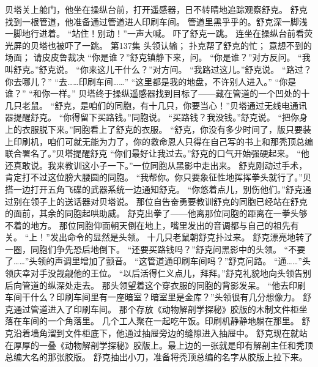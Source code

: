 \documentclass[a4paper,12pt,UTF8,twoside]{ctexbook}
\begin{document}
        贝塔关上舱门，他坐在操纵台前，打开遥感器，日不转睛地追踪观察舒克。 
        舒克找到一根管道，他准备通过管道进人印刷车间。 
        管道里黑乎乎的。舒克深一脚浅一脚地行进着。 
        “站住！别动！”一声大喊。 
        吓了舒克一跳。 
        连坐在操纵台前看荧光屏的贝塔也被吓了一跳。   第137集 
        头领认输； 
        扑克帮了舒克的忙； 
        意想不到的场面； 
        请皮皮鲁裁决   
        “你是谁？”舒克镇静下来，问。 
        “你是谁？”对方反问。 
        “我叫舒克。”舒克说。 
        “你来这儿干什么？”对方间。 
        “我路过这儿。”舒克说。 
        “路过？你去哪儿？” 
        “去……印刷车间……” 
        “这里都是我的地盘，不许别人进入。” 
        “你是谁？” 
        “和你一样。” 
        贝塔终于操纵遥感器找到目标了——藏在管道的一个凹处的十几只老鼠。 
        “舒克，是咱们的同胞，有十几只，你要当心！”贝塔通过无线电通讯器提醒舒克。 
        “你得留下买路钱。”同胞说。 
        “买路钱？我没钱。”舒克说。 
        “把你身上的衣服脱下来。”同胞看上了舒克的衣服。 
        “舒克，你没有多少时间了，版只要装上印刷机，咱们可就无能为力了，你的救命恩人只得在自己写的书上和那秃顶总编联合署名了。”贝塔提醒舒克 
        “你们最好让我过去。”舒克的口气开始强硬起来。 
        “他还真敢说。我来教训这小子一下。”一位同胞从黑影中走出来。 
        舒克刚动过手术，肯定打不过这位膀大腰圆的同胞。 
        “我帮你。你只要象征性地挥挥拳头就行了。”贝搭一边打开五角飞碟的武器系统一边通知舒克。 
        “你悠着点儿，别伤他们。”舒克通过别在领子上的送话器对贝塔说。 
        那位自告奋勇要教训舒克的同胞已经站在舒克的面前，其余的同胞起哄助威。 
        舒克出拳了——他离那位同胞的距离在一拳头够不着的地方。 
        那位同胞仰面朝天倒在地上，嘴里发出的音调都与自己的祖先有关。 
        “上！”发出命令的显然是头领。 
        十几只老鼠朝舒克扑过来。 
        舒克漂亮地转了一圈，同胞们争先恐后地倒下。 
        “还要买路钱吗？”舒克问黑影中的头领。 
        “不要了……”头领的声调里增加了颤音。 
        “这管道通印刷车间吗？”舒克问路。 
        “通……”头领庆幸对手没觊觎他的王位。 
        “以后活得仁义点儿，拜拜。”舒克礼貌地向头领告别后向管道的纵深处走去。 
        那头领望着这个穿衣服的同胞的背影发呆。 
        “他去印刷车间干什么？印刷车间里有一座暗室？暗室里是金库？”头领很有几分想像力。 
        舒克通过管道进入了印刷车间。 
        那个存放《动物解剖学探秘》胶版的木制文件柜坐落在车间的一个角落里。 
        几个工人聚在一起吃午饭。印刷机静静地躺在那里。 
        舒克沿着墙角溜到文件柜底下，他通过抽屉旁边的缝隙进入抽屉中。 
        舒克现在就站在厚厚的一叠《动物解剖学探秘》胶版上。最上边的一张就是印有解剖主任和秃顶总编大名的那张胶版。 
        舒克抽出小刀，准备将秃顶总编的名字从胶版上拉下来。 
\end{document}
